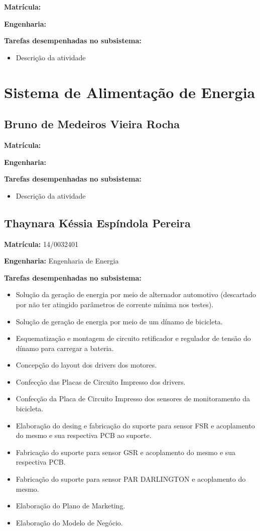 \textbf{Matrícula:}

\textbf{Engenharia:}

\textbf{Tarefas desempenhadas no subsistema:}

\begin{itemize}
\item Descrição da atividade
\end{itemize}


\section{Sistema de Alimentação de Energia}

\subsection{Bruno de Medeiros Vieira Rocha}

\textbf{Matrícula:}

\textbf{Engenharia:}

\textbf{Tarefas desempenhadas no subsistema:}

\begin{itemize}
\item Descrição da atividade
\end{itemize}


\subsection{Thaynara Késsia Espíndola Pereira}

\textbf{Matrícula:} 14/0032401

\textbf{Engenharia:} Engenharia de Energia

\textbf{Tarefas desempenhadas no subsistema:}

\begin{itemize}
\item
Solução da geração de energia por meio de alternador automotivo (descartado por não ter atingido parâmetros de corrente mínima nos testes).
\item
Solução de geração de energia por meio de um dínamo de bicicleta.
\item
Esquematização e montagem de circuito retificador e regulador de tensão do dínamo para carregar a bateria.
\item
Concepção do layout dos drivers dos motores.
\item
Confecção das Placas de Circuito Impresso dos drivers.
\item
Confecção da Placa de Circuito Impresso dos sensores de monitoramento da bicicleta.
\item
Elaboração do desing e fabricação do suporte para sensor FSR e acoplamento do mesmo e sua respectiva PCB ao suporte.
\item
Fabricação do suporte para sensor GSR e acoplamento do mesmo e sua respectiva PCB.
\item
Fabricação do suporte para sensor PAR DARLINGTON e acoplamento do mesmo.
\item
Elaboração do Plano de Marketing.
\item
Elaboração do Modelo de Negócio.
\end{itemize}

